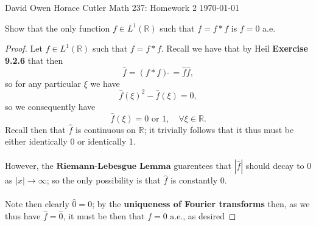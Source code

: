 \documentclass[12pt]{article}
\newenvironment{ex}[2][Exercise]{\begin{trivlist}
\item[\hskip \labelsep {\bfseries #1}\hskip \labelsep {\bfseries #2.}]}{\end{trivlist}}
\begin{document}
\noindent David Owen Horace Cutler \hfill {\Large Math 237: Homework 2} \hfill \today

\begin{ex}{1}
    Show that the only function $f \in L^1(\mathbb{R})$ such that $f = f * f$ is $f = 0$ a.e. 
    \begin{proof}
        Let $f \in L^1(\mathbb{R})$ such that $f = f * f$. Recall we have that by Heil \textbf{Exercise 9.2.6} that then 
        $$\hat{f} = (f * f)\hat{\;} = \hat{f}\hat{f},$$
        so for any particular $\xi$ we have 
        $$\hat{f}(\xi)^2 - \hat{f}(\xi) = 0,$$
        so we consequently have 
        $$\hat{f}(\xi) = 0 \text{ or } 1, \quad \forall \xi \in \mathbb{R}.$$
        Recall then that $\hat{f}$ is continuous on $\mathbb{R}$; it trivially follows that it thus must be either identically 0 or identically 1. \\ \\
        However, the $\textbf{Riemann-Lebesgue Lemma}$ guarentees that $|\hat{f}|$ should decay to $0$ as $|x| \rightarrow \infty$; so the only possibility is that $\hat{f}$ is constantly 0. \\ \\
        Note then clearly $\hat{0} = 0$; by the \textbf{uniqueness of Fourier transforms} then, as we thus have $\hat{f} = \hat{0}$, it must be then that $f = 0 \text{ a.e.}$, as desired
    \end{proof}
\end{ex}
\end{document}
